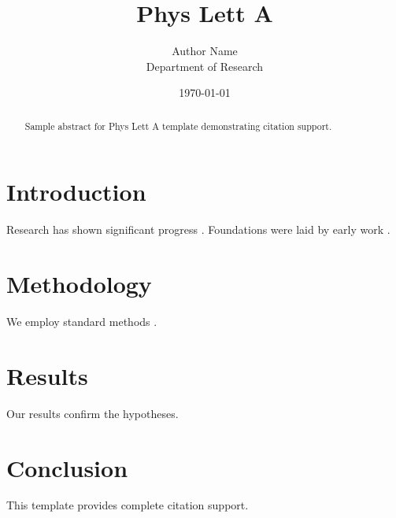 ﻿\documentclass{elsarticle}
\title{Phys Lett A}
\author{Author Name \\ \small Department of Research}
\date{\today}
\begin{document}
\maketitle

\begin{abstract}
Sample abstract for Phys Lett A template demonstrating citation support.
\end{abstract}

\section{Introduction}
Research has shown significant progress \citep{einstein1905}. Foundations were laid by early work \citep{turing1950}.

\section{Methodology}
We employ standard methods \citep{knuth1984}.

\section{Results}
Our results confirm the hypotheses.

\section{Conclusion}
This template provides complete citation support.



\end{document}
